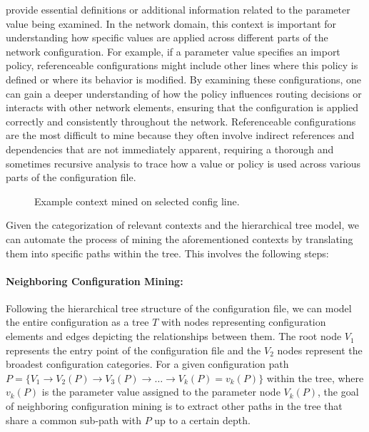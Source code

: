     provide essential definitions or additional information related to the
    parameter value being examined. In the network domain, this context is
    important for understanding how specific values are applied across different parts of the network configuration. For example, if a parameter value specifies an import policy, referenceable configurations might include other lines where this policy is defined or where its behavior is modified. By examining these configurations, one can gain a deeper understanding of how the policy influences routing decisions or interacts with other network elements, ensuring that the configuration is applied correctly and consistently throughout the network.
    Referenceable configurations are the most difficult to mine because they often involve indirect references and dependencies that are not immediately apparent, requiring a thorough and sometimes recursive analysis to trace how a value or policy is used across various parts of the configuration file.

\begin{figure}[t]
    \centering
    \caption{Example context mined on selected config line.}
    \label{fig:context_mine}
\end{figure}

Given the categorization of relevant contexts and the hierarchical tree model, we can automate the process of mining the aforementioned contexts by translating them into specific paths within the tree. This involves the following steps:

\paragraph{Neighboring Configuration Mining:}
    Following the hierarchical tree structure of the configuration file, we can model the entire configuration as a tree \( T \) with nodes representing configuration elements and edges depicting the relationships between them. The root node \(V_1\) represents the entry point of the configuration file and the \(V_2\) nodes represent the broadest configuration categories.
    For a given configuration path \( P = \{ V_1 \rightarrow V_2(P) \rightarrow V_3(P) \rightarrow \dots \rightarrow V_k(P) = v_k(P) \} \) within the tree, where \( v_k(P) \) is the parameter value assigned to the parameter node \( V_k(P) \), the goal of neighboring configuration mining is to extract other paths in the tree that share a common sub-path with \( P \) up to a certain depth. 
    
